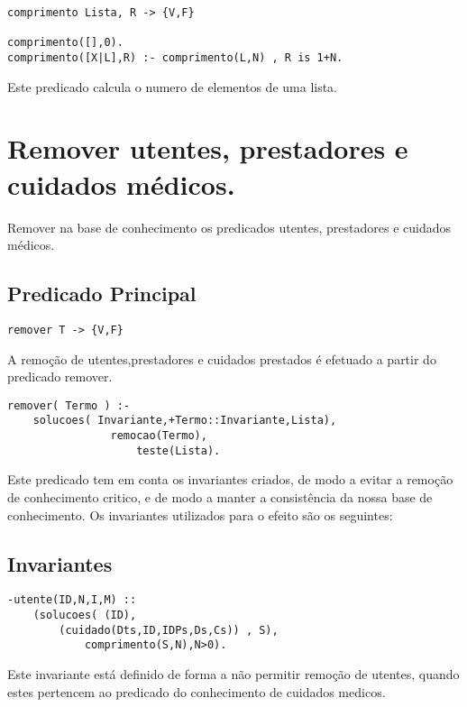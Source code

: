 \documentclass{report}
\def\titulo#1{\section{#1}}
\begin{document}
\begin{verbatim}
comprimento Lista, R -> {V,F}

comprimento([],0).
comprimento([X|L],R) :- comprimento(L,N) , R is 1+N.
\end{verbatim}
Este predicado calcula o numero de elementos de uma lista.
\bigbreak





























\titulo{Remover utentes, prestadores e cuidados médicos.}

Remover na base de conhecimento os predicados utentes, prestadores e cuidados médicos. 

\subsection{Predicado Principal}
 
\begin{verbatim}
remover T -> {V,F}
\end{verbatim}
 
A remoção de utentes,prestadores e cuidados prestados é efetuado a partir do predicado remover. 
 

\begin{verbatim}
remover( Termo ) :-
    solucoes( Invariante,+Termo::Invariante,Lista), 
                remocao(Termo), 
                    teste(Lista).
\end{verbatim}

Este predicado tem em conta os invariantes criados, de modo a evitar a remoção de conhecimento critico, e de modo a manter a consistência da nossa base de conhecimento. Os invariantes utilizados para o efeito são os seguintes:    

\subsection{Invariantes}

\begin{verbatim}
-utente(ID,N,I,M) :: 
    (solucoes( (ID), 
        (cuidado(Dts,ID,IDPs,Ds,Cs)) , S),
            comprimento(S,N),N>0).
\end{verbatim}
Este invariante está definido de forma a não permitir remoção de utentes, quando estes pertencem ao predicado do conhecimento de cuidados medicos.
\bigbreak
\end{document}
